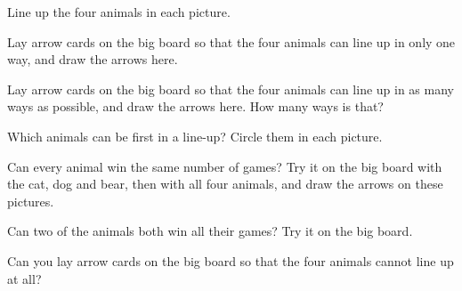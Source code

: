 \documentclass[12pt]{article}
\begin{document}
\newpage
\prob Line up the four animals in each picture.

\vspace{0.4cm}
\begin{center}
\hspace{2.2cm}

\vspace{0.6cm}
\hspace{2.2cm}
\end{center}

\vspace{0.6cm}
\prob Lay arrow cards on the big board so that the four animals can line up in only one way, and draw the arrows here.

\vspace{0.4cm}
\centerline{}

\newpage
\prob Lay arrow cards on the big board so that the four animals can line up in as many ways as possible, and draw the arrows here. How many ways is that?

\vspace{0.5cm}
\begin{center}
\hspace{1.2cm}%
\hspace{1.0cm}%
\end{center}

\vspace{1.0cm}
\prob Which animals can be first in a line-up? Circle them in each picture.

\vspace{0.4cm}
\begin{center}
\mbox{\hspace{1.2cm}\hspace{1.2cm}}
\end{center}

\newpage
\prob Can every animal win the same number of games? Try it on the big board with the cat, dog and bear, then with all four animals, and draw the arrows on these pictures.

\vspace{0.5cm}
\begin{center}
\hspace{2.5cm}
\end{center}

\vspace{1.2cm}
\prob Can two of the animals both win all their games? Try it on the big board.

\vspace{3.5cm}
\prob Can you lay arrow cards on the big board so that the four animals cannot line up at all?
\end{document}
